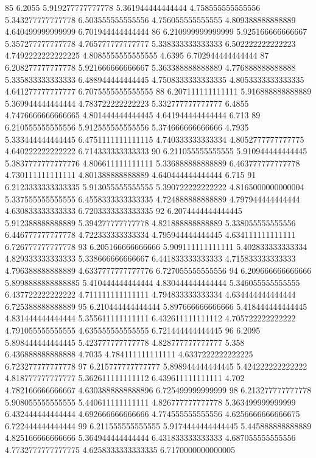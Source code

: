 85 6.2055 5.919277777777778 5.361944444444444 4.758555555555556 5.343277777777778 6.503555555555556 4.756055555555555 4.809388888888889 4.640499999999999 6.701944444444444
86 6.210999999999999 5.925166666666667 5.357277777777778 4.765777777777777 5.338333333333333 6.502222222222223 4.7492222222222225 4.8085555555555555 4.6395 6.702944444444444
87 6.208277777777778 5.921666666666667 5.363388888888889 4.776888888888888 5.335833333333333 6.488944444444445 4.7508333333333335 4.8053333333333335 4.641277777777777 6.7075555555555555
88 6.207111111111111 5.916888888888889 5.369944444444444 4.783722222222223 5.332777777777777 6.4855 4.7476666666666665 4.801444444444445 4.641944444444444 6.713
89 6.210555555555556 5.912555555555556 5.374666666666666 4.7935 5.333444444444445 6.4751111111111115 4.740333333333334 4.8052777777777775 4.640222222222222 6.714333333333333
90 6.211055555555555 5.910944444444445 5.3837777777777776 4.806611111111111 5.336888888888889 6.463777777777778 4.730111111111111 4.801388888888889 4.640444444444444 6.715
91 6.2123333333333335 5.913055555555555 5.390722222222222 4.8165000000000004 5.337555555555555 6.4558333333333335 4.724888888888889 4.797944444444444 4.630833333333333 6.7203333333333335
92 6.2074444444444445 5.912388888888889 5.394277777777778 4.821888888888889 5.338055555555556 6.446777777777778 4.722333333333334 4.795944444444445 4.634111111111111 6.726777777777778
93 6.205166666666666 5.909111111111111 5.402833333333334 4.829333333333333 5.338666666666667 6.441833333333333 4.715833333333333 4.796388888888889 4.6337777777777776 6.727055555555556
94 6.209666666666666 5.8998888888888885 5.410444444444444 4.830444444444444 5.346055555555555 6.437722222222222 4.711111111111111 4.794833333333334 4.634444444444444 6.725388888888889
95 6.210444444444444 5.897666666666666 5.418444444444445 4.831444444444444 5.355611111111111 6.432611111111112 4.705722222222222 4.791055555555555 4.635555555555555 6.721444444444445
96 6.2095 5.898444444444445 5.423777777777778 4.828777777777777 5.358 6.436888888888888 4.7035 4.784111111111111 4.6337222222222225 6.723277777777778
97 6.215777777777777 5.898944444444445 5.424222222222222 4.818777777777777 5.362611111111112 6.439611111111111 4.702 4.782166666666667 4.6303888888888896 6.725499999999999
98 6.213277777777778 5.908055555555555 5.440611111111111 4.826777777777778 5.363499999999999 6.432444444444444 4.692666666666666 4.774555555555556 4.6256666666666675 6.722444444444444
99 6.211555555555555 5.9174444444444445 5.445888888888889 4.825166666666666 5.364944444444444 6.431833333333333 4.687055555555556 4.7732777777777775 4.6258333333333335 6.7170000000000005
